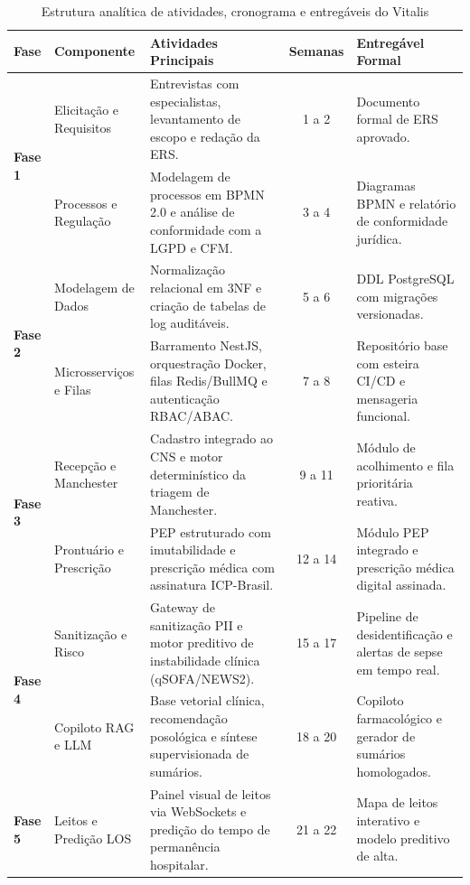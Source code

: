 \begin{table}[H]
\centering
\scriptsize
\caption{Estrutura analítica de atividades, cronograma e entregáveis do Vitalis}
\label{tab:cronograma_vitalis}
\begin{tabularx}{\textwidth}{l >{\raggedright\arraybackslash}p{2.8cm} >{\raggedright\arraybackslash}X c >{\raggedright\arraybackslash}p{3.5cm}}
\toprule
\textbf{Fase} & \textbf{Componente} & \textbf{Atividades Principais} & \textbf{Semanas} & \textbf{Entregável Formal} \\
\midrule
\multirow{2}{*}{\textbf{Fase 1}} & Elicitação e Requisitos & Entrevistas com especialistas, levantamento de escopo e redação da ERS. & 1 a 2 & Documento formal de ERS  aprovado. \\
\cmidrule(lr){2-5}
 & Processos e Regulação & Modelagem de processos em BPMN 2.0 e análise de conformidade com a LGPD e CFM. & 3 a 4 & Diagramas BPMN e relatório de conformidade jurídica. \\
\midrule
\multirow{2}{*}{\textbf{Fase 2}} & Modelagem de Dados & Normalização relacional em 3NF e criação de tabelas de log auditáveis. & 5 a 6 & DDL PostgreSQL com migrações versionadas. \\
\cmidrule(lr){2-5}
 & Microsserviços e Filas & Barramento NestJS, orquestração Docker, filas Redis/BullMQ e autenticação RBAC/ABAC. & 7 a 8 & Repositório base com esteira CI/CD e mensageria funcional. \\
\midrule
\multirow{2}{*}{\textbf{Fase 3}} & Recepção e Manchester & Cadastro integrado ao CNS e motor determinístico da triagem de Manchester. & 9 a 11 & Módulo de acolhimento e fila prioritária reativa. \\
\cmidrule(lr){2-5}
 & Prontuário e Prescrição & PEP estruturado com imutabilidade e prescrição médica com assinatura ICP-Brasil. & 12 a 14 & Módulo PEP integrado e prescrição médica digital assinada. \\
\midrule
\multirow{2}{*}{\textbf{Fase 4}} & Sanitização e Risco & Gateway de sanitização PII e motor preditivo de instabilidade clínica (qSOFA/NEWS2). & 15 a 17 & Pipeline de desidentificação e alertas de sepse em tempo real. \\
\cmidrule(lr){2-5}
 & Copiloto RAG e LLM & Base vetorial clínica, recomendação posológica e síntese supervisionada de sumários. & 18 a 20 & Copiloto farmacológico e gerador de sumários homologados. \\
\midrule
\multirow{2}{*}{\textbf{Fase 5}} & Leitos e Predição LOS & Painel visual de leitos via WebSockets e predição do tempo de permanência hospitalar. & 21 a 22 & Mapa de leitos interativo e modelo preditivo de alta. \\

\end{tabularx}
\end{table}
